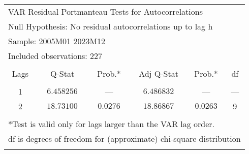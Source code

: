 \begin{tabular}{lrrrrr}
\multicolumn{6}{l}{VAR Residual Portmanteau Tests for Autocorrelations}\\
\multicolumn{6}{l}{Null Hypothesis: No residual autocorrelations up to lag h}\\
\multicolumn{3}{l}{Sample: 2005M01 2023M12}&\multicolumn{1}{c}{}&\multicolumn{1}{c}{}&\multicolumn{1}{c}{}\\
\multicolumn{3}{l}{Included observations: 227}&\multicolumn{1}{c}{}&\multicolumn{1}{c}{}&\multicolumn{1}{c}{}\\
[4.5pt] \hline \\ [-4.5pt]
\multicolumn{1}{c}{Lags}&\multicolumn{1}{c}{Q-Stat}&\multicolumn{1}{c}{Prob.*}&\multicolumn{1}{c}{Adj Q-Stat}&\multicolumn{1}{c}{Prob.*}&\multicolumn{1}{c}{df}\\
[4.5pt] \hline \\ [-4.5pt]
\multicolumn{1}{c}{1}&\multicolumn{1}{c}{$6.458256$}&\multicolumn{1}{c}{---}&\multicolumn{1}{c}{$6.486832$}&\multicolumn{1}{c}{---}&\multicolumn{1}{c}{---}\\
\multicolumn{1}{c}{2}&\multicolumn{1}{c}{$18.73100$}&\multicolumn{1}{c}{$0.0276$}&\multicolumn{1}{c}{$18.86867$}&\multicolumn{1}{c}{$0.0263$}&\multicolumn{1}{c}{9}\\
[4.5pt] \hline \\ [-4.5pt]
\multicolumn{6}{l}{*Test is valid only for lags larger than the VAR lag order.}\\
\multicolumn{7}{l}{df is degrees of freedom for (approximate) chi-square distribution}\\
\multicolumn{1}{c}{}&\multicolumn{1}{c}{}&\multicolumn{1}{c}{}&\multicolumn{1}{c}{}&\multicolumn{1}{c}{}&\multicolumn{1}{c}{}\\
\end{tabular}